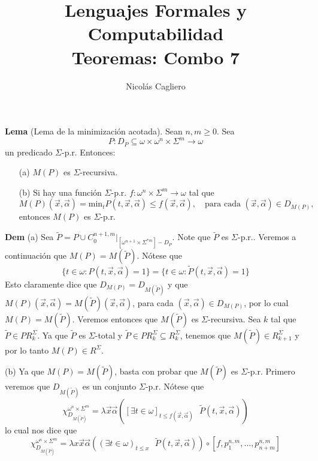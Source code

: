 \documentclass{article}
\title{Lenguajes Formales y Computabilidad \\
        \large Teoremas: Combo 7 }
\author{Nicolás Cagliero}
\begin{document}
\maketitle

\textbf{Lema} (Lema de la minimización acotada). Sean \( n, m \geq 0 \). Sea 
\[
P : D_P \subseteq \omega \times \omega^n \times \Sigma^m \to \omega
\]
un predicado \( \Sigma \)-p.r. Entonces:

\begin{itemize}
    \item[(a)] \( M(P) \) es \( \Sigma \)-recursiva.
    \item[(b)] Si hay una función \( \Sigma \)-p.r. \( f : \omega^n \times \Sigma^m \to \omega \) tal que 
    \[
    M(P)(\vec{x}, \vec{\alpha}) = \text{min}_t P(t, \vec{x}, \vec{\alpha}) \leq f(\vec{x}, \vec{\alpha}), \quad \text{para cada } (\vec{x}, \vec{\alpha}) \in D_{M(P)},
    \]
    entonces \( M(P) \) es \( \Sigma \)-p.r.
\end{itemize}

\textbf{Dem} (a) Sea \( \widetilde{P} = P \cup C^{n+1,m}_0|_{[\omega^{n+1} \times \Sigma^{*m}] - D_P} \). Note que \( \widetilde{P} \) es \( \Sigma \)-p.r.. Veremos a continuación que \( M(P) = M(\widetilde{P}) \). Nótese que
\[
\{t \in \omega : P(t, \vec{x}, \vec{\alpha}) = 1\} = \{t \in \omega : \widetilde{P}(t, \vec{x}, \vec{\alpha}) = 1\}
\]
Esto claramente dice que \( D_{M(P)} = D_{M(\widetilde{P})} \) y que \( M(P)(\vec{x}, \vec{\alpha}) = M(\widetilde{P})(\vec{x}, \vec{\alpha}) \), para cada \( (\vec{x}, \vec{\alpha}) \in D_{M(P)} \), por lo cual \( M(P) = M(\widetilde{P}) \). Veremos entonces que \( M(\widetilde{P}) \) es \( \Sigma \)-recursiva. Sea \( k \) tal que \( \widetilde{P} \in PR^{\Sigma}_k \). Ya que \( \widetilde{P} \) es \( \Sigma \)-total y \( \widetilde{P} \in PR^{\Sigma}_k \subseteq R^{\Sigma}_k \), tenemos que \( M(\widetilde{P}) \in R^{\Sigma}_{k+1} \) y por lo tanto \( M(P) \in R^{\Sigma} \).

(b) Ya que \( M(P) = M(\widetilde{P}) \), basta con probar que \( M(\widetilde{P}) \) es \( \Sigma \)-p.r. Primero veremos que \( D_{M(\widetilde{P})} \) es un conjunto \( \Sigma \)-p.r. Nótese que
\[
\chi^{\omega^n \times \Sigma^m}_{D_{M(\widetilde{P})}} = \lambda \vec{x} \vec{\alpha} \left( [\exists t \in \omega]_{t \leq f(\vec{x}, \vec{\alpha})} \text{ } \widetilde{P}(t, \vec{x}, \vec{\alpha}) \right)
\]
lo cual nos dice que 
\[
\chi^{\omega^n \times \Sigma^m}_{D_{M(\widetilde{P})}} = \lambda x \vec{x} \vec{\alpha} \left( (\exists t \in \omega)_{t \leq x} \text{ } \widetilde{P}(t, \vec{x}, \vec{\alpha}) \right) \circ [f, p^{n, m}_1, \ldots, p^{n, m}_{n+m}]
\]
\end{document}
